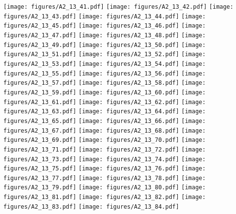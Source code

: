 \documentclass[12pt,a4paper]{article}
\begin{document}
\texttt{[image: figures/A2\_13\_41.pdf]}
\texttt{[image: figures/A2\_13\_42.pdf]}
\texttt{[image: figures/A2\_13\_43.pdf]}
\texttt{[image: figures/A2\_13\_44.pdf]}
\texttt{[image: figures/A2\_13\_45.pdf]}
\texttt{[image: figures/A2\_13\_46.pdf]}
\texttt{[image: figures/A2\_13\_47.pdf]}
\texttt{[image: figures/A2\_13\_48.pdf]}
\texttt{[image: figures/A2\_13\_49.pdf]}
\texttt{[image: figures/A2\_13\_50.pdf]}
\texttt{[image: figures/A2\_13\_51.pdf]}
\texttt{[image: figures/A2\_13\_52.pdf]}
\texttt{[image: figures/A2\_13\_53.pdf]}
\texttt{[image: figures/A2\_13\_54.pdf]}
\texttt{[image: figures/A2\_13\_55.pdf]}
\texttt{[image: figures/A2\_13\_56.pdf]}
\texttt{[image: figures/A2\_13\_57.pdf]}
\texttt{[image: figures/A2\_13\_58.pdf]}
\texttt{[image: figures/A2\_13\_59.pdf]}
\texttt{[image: figures/A2\_13\_60.pdf]}
\texttt{[image: figures/A2\_13\_61.pdf]}
\texttt{[image: figures/A2\_13\_62.pdf]}
\texttt{[image: figures/A2\_13\_63.pdf]}
\texttt{[image: figures/A2\_13\_64.pdf]}
\texttt{[image: figures/A2\_13\_65.pdf]}
\texttt{[image: figures/A2\_13\_66.pdf]}
\texttt{[image: figures/A2\_13\_67.pdf]}
\texttt{[image: figures/A2\_13\_68.pdf]}
\texttt{[image: figures/A2\_13\_69.pdf]}
\texttt{[image: figures/A2\_13\_70.pdf]}
\texttt{[image: figures/A2\_13\_71.pdf]}
\texttt{[image: figures/A2\_13\_72.pdf]}
\texttt{[image: figures/A2\_13\_73.pdf]}
\texttt{[image: figures/A2\_13\_74.pdf]}
\texttt{[image: figures/A2\_13\_75.pdf]}
\texttt{[image: figures/A2\_13\_76.pdf]}
\texttt{[image: figures/A2\_13\_77.pdf]}
\texttt{[image: figures/A2\_13\_78.pdf]}
\texttt{[image: figures/A2\_13\_79.pdf]}
\texttt{[image: figures/A2\_13\_80.pdf]}
\texttt{[image: figures/A2\_13\_81.pdf]}
\texttt{[image: figures/A2\_13\_82.pdf]}
\texttt{[image: figures/A2\_13\_83.pdf]}
\texttt{[image: figures/A2\_13\_84.pdf]}
\end{document}
